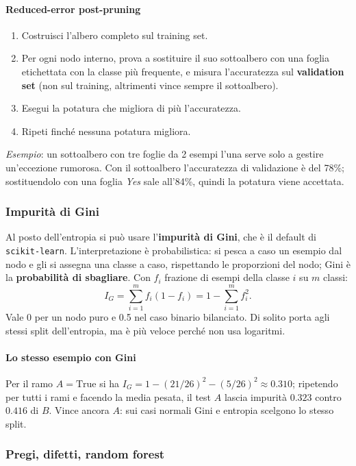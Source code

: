 \documentclass[12pt]{extarticle}
\begin{document}
\paragraph{Reduced-error post-pruning}
\begin{enumerate}
    \item Costruisci l'albero completo sul training set.
    \item Per ogni nodo interno, prova a sostituire il suo sottoalbero con una foglia etichettata con la classe più frequente, e misura l'accuratezza sul \textbf{validation set} (non sul training, altrimenti vince sempre il sottoalbero).
    \item Esegui la potatura che migliora di più l'accuratezza.
    \item Ripeti finché nessuna potatura migliora.
\end{enumerate}
\textit{Esempio}: un sottoalbero con tre foglie da 2 esempi l'una serve solo a gestire un'eccezione rumorosa. Con il sottoalbero l'accuratezza di validazione è del 78\%; sostituendolo con una foglia \textit{Yes} sale all'84\%, quindi la potatura viene accettata.

\subsubsection{Impurità di Gini}

\noindent Al posto dell'entropia si può usare l'\textbf{impurità di Gini}, che è il default di \texttt{scikit-learn}. L'interpretazione è probabilistica: si pesca a caso un esempio dal nodo e gli si assegna una classe a caso, rispettando le proporzioni del nodo; Gini è la \textbf{probabilità di sbagliare}. Con $f_i$ frazione di esempi della classe $i$ su $m$ classi:
\[
I_G = \sum_{i=1}^{m} f_i(1-f_i) = 1 - \sum_{i=1}^{m} f_i^2 .
\]
Vale 0 per un nodo puro e 0.5 nel caso binario bilanciato. Di solito porta agli stessi split dell'entropia, ma è più veloce perché non usa logaritmi.

\paragraph{Lo stesso esempio con Gini}
Per il ramo $A=\text{True}$ si ha $I_G = 1-(21/26)^2-(5/26)^2 \approx 0.310$; ripetendo per tutti i rami e facendo la media pesata, il test $A$ lascia impurità $0.323$ contro $0.416$ di $B$. Vince ancora $A$: sui casi normali Gini e entropia scelgono lo stesso split.

\subsubsection{Pregi, difetti, random forest}
\end{document}

